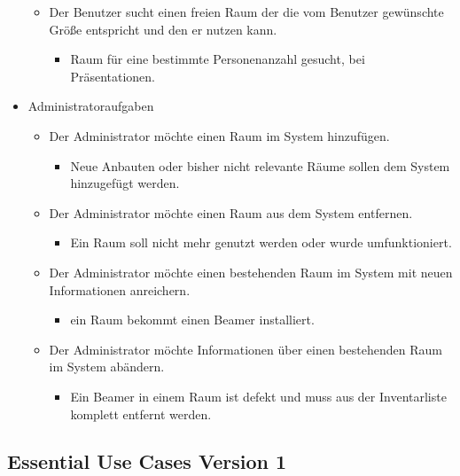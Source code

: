 \begin{itemize}
\begin{itemize}[noitemsep]
\begin{itemize}
		\end{itemize}
		\item Der Benutzer sucht einen freien Raum der die vom Benutzer gewünschte Größe entspricht und den er nutzen kann.
		\begin{itemize}
			\item Raum für eine bestimmte Personenanzahl gesucht, \bspw bei Präsentationen.
		\end{itemize}
	\end{itemize}
	\item Administratoraufgaben
	\begin{itemize}[noitemsep]
		\item Der Administrator möchte einen Raum im System hinzufügen.
		\begin{itemize}
			\item Neue Anbauten oder bisher nicht relevante Räume sollen dem System hinzugefügt werden.
		\end{itemize}
		\item Der Administrator möchte einen Raum aus dem System entfernen.
		\begin{itemize}
			\item Ein Raum soll nicht mehr genutzt werden oder wurde umfunktioniert.
		\end{itemize}
		\item Der Administrator möchte einen bestehenden Raum im System mit neuen Informationen anreichern.
		\begin{itemize}
			\item \Bspw ein Raum bekommt einen Beamer installiert.
		\end{itemize}
		\item Der Administrator möchte Informationen über einen bestehenden Raum im System abändern.
		\begin{itemize}
			\item Ein Beamer in einem Raum ist defekt und muss aus der Inventarliste komplett entfernt werden.
		\end{itemize}
	\end{itemize}
\end{itemize}
\clearpage

\subsection{Essential Use Cases Version 1}
\label{anhang:Essential_Use_Cases_v1}

